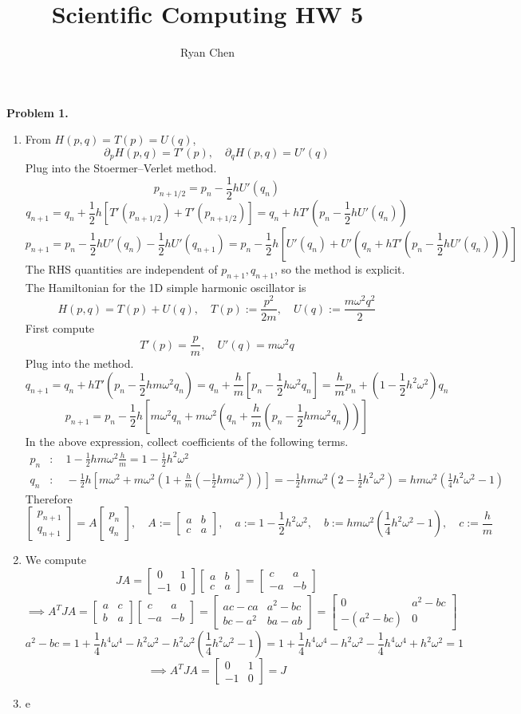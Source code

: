 \documentclass{article}
\title{Scientific Computing HW 5}
\author{Ryan Chen}
\def\tbf#1{\textbf{#1}}
\newcommand{\br}[1]{\left(#1\right)}
\newcommand{\sbr}[1]{\left[#1\right]}
\newcommand{\m}[2][b]{\begin{#1matrix}#2\end{#1matrix}}
\newcommand{\imp}{\implies}
\newcommand{\ptl}{\partial}
\newcommand{\om}{\omega}
\begin{document}
	
\maketitle



\tbf{Problem 1.}

\begin{enumerate}
	
\item From $H(p,q)=T(p)=U(q)$,
$$\ptl_pH(p,q) = T'(p),
\quad \ptl_qH(p,q) = U'(q)$$
Plug into the Stoermer--Verlet method.
$$p_{n+1/2} = p_n - \frac12hU'(q_n)$$
$$q_{n+1} = q_n + \frac12h[T'(p_{n+1/2}) + T'(p_{n+1/2})]
= q_n + hT'\br{p_n - \frac12hU'(q_n)}$$
$$p_{n+1} = p_n - \frac12hU'(q_n) - \frac12hU'(q_{n+1})
= p_n - \frac12h\sbr{U'(q_n) + U'\br{q_n + hT'\br{p_n - \frac12hU'(q_n)}}}$$
The RHS quantities are independent of $p_{n+1},q_{n+1}$, so the method is explicit.\\

The Hamiltonian for the 1D simple harmonic oscillator is
$$H(p,q) = T(p) + U(q),
\quad T(p) := \frac{p^2}{2m},
\quad U(q) := \frac{m\om^2q^2}{2}$$
First compute
$$T'(p) = \frac pm,
\quad U'(q) = m\om^2q$$
Plug into the method.
$$q_{n+1} = q_n + hT'\br{p_n - \frac12hm\om^2q_n}
= q_n + \frac hm\sbr{p_n - \frac12h\om^2q_n}
= \frac hmp_n + \br{1 - \frac12h^2\om^2}q_n$$
$$p_{n+1} = p_n - \frac12h\sbr{m\om^2q_n + m\om^2\br{q_n + \frac hm\br{p_n - \frac12hm\om^2q_n}}}$$
In the above expression, collect coefficients of the following terms.
\begin{align*}
	p_n &: \quad 1 - \frac12hm\om^2\frac hm = 1 - \frac12h^2\om^2 \\
	q_n &: \quad -\frac12h\sbr{m\om^2 + m\om^2\br{1+ \frac hm\br{-\frac12hm\om^2}}}
	= -\frac12hm\om^2\br{2 - \frac12h^2\om^2}
	= hm\om^2\br{\frac14h^2\om^2 - 1}
\end{align*}
Therefore
$$\m{p_{n+1} \\ q_{n+1}} = A\m{p_n \\ q_n},
\quad A := \m{a & b \\ c & a},
\quad a := 1 - \frac12h^2\om^2,
\quad b := hm\om^2\br{\frac14h^2\om^2 - 1},
\quad c := \frac hm$$


\item We compute
$$JA = \m{0 & 1 \\ -1 & 0}\m{a & b \\ c & a}
= \m{c & a \\ -a & -b}$$
$$\imp A^TJA = \m{a & c \\ b & a}\m{c & a \\ -a & -b}
= \m{ac-ca & a^2-bc \\ bc-a^2 & ba-ab}
= \m{0 & a^2-bc \\ -(a^2-bc) & 0}$$
$$a^2 - bc = 1 + \frac14h^4\om^4 - h^2\om^2 - h^2\om^2\br{\frac14h^2\om^2 - 1}
= 1 + \frac14h^4\om^4 - h^2\om^2 - \frac14h^4\om^4 + h^2\om^2
= 1$$
$$\imp A^TJA = \m{0 & 1 \\ -1 & 0} = J$$


\item e

\end{enumerate}

	
\end{document}
